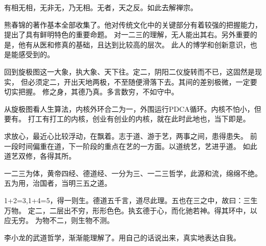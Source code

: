 有相无相，无非无，乃无相。无者，天之反。如此去解禅宗。

熊春锦的著作基本全部收集了。他对传统文化中的关键部分有着较强的把握能力，提出了具有鲜明特色的重要命题。
对一二三的理解，无人能出其右。另外重要的是，他有从医和修真的基础，且达到比较高的层次。
此人的博学和创新意识，也是能感受到的。

回到旋极图这一大象，执大象、天下往。定二，阴阳二仪旋转而不已，这固然是现实，
但必须定二，开出天地两极，不至随便滑落下去。其间的差别极微，一定要切实把握。
修之身，其德乃真。多言数穷，不如守中。

从旋极图看人生算法，内核外环合二为一，外围运行PDCA循环。内核不怕小，但要有。
打工有打工的内核，创业有创业的内核，就在此时此地也，当下即是。

求放心，最近心比较浮动，在飘着。志于道、游于艺，两事之间，患得患失。
前一段时间偏重在道，下一阶段的重点在艺的一方面。以道统艺，艺进乎道。
如此道艺双修，各得其所。

一二三为体，黄帝四经、德道经、一分为三、一二三哲学，此源和流，绵绵不绝。
五为用，治国者，当明三五之道。

1+2=3,1+4=5，得一则生。德道五千言，道尽此理。五也在三之中，故曰：三生万物。
定二，二层出不穷，形形色色。执玄德于心，而化驰若神。得其环中，以应无穷。
为物不二，则生物不测。

李小龙的武道哲学，渐渐能理解了。用自己的话说出来，真实地表达自我。


